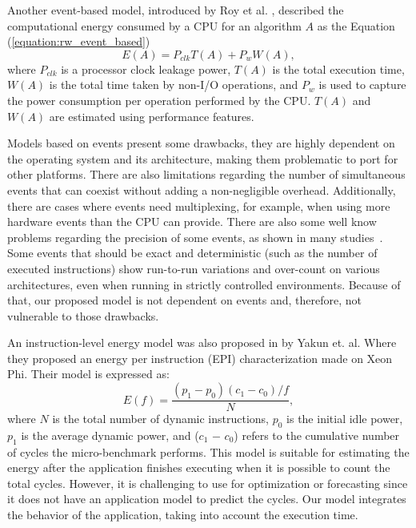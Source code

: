 Another event-based model, introduced by Roy et al. \cite{Roy2013AnAlgorithms}, described the computational energy consumed by a CPU for an algorithm $A$ as the Equation (\ref{equation:rw_event_based})%
\begin{equation}
E(A) = P_{clk}T(A) + P_wW(A),
\label{equation:rw_event_based}
\end{equation}
where $P_{clk}$ is a processor clock leakage power, $T(A)$ is the total execution time, $W(A)$ is the total time taken by  non-I/O operations, and $P_w$ is used to capture the power consumption per operation performed by the CPU. $T(A)$ and $W(A)$ are estimated using performance features.

Models based on events present some drawbacks, they are highly dependent on the operating system and its architecture, making them problematic to port for other platforms. There are also limitations regarding the number of simultaneous events that can coexist without adding a non-negligible overhead. Additionally, there are cases where events need multiplexing, for example, when using more hardware events than %
the CPU can provide. There are also some well know problems regarding the precision of some events, as shown in many studies~\cite{Weaver2008CanTrusted, Weaver2013Non-determinismImplementations, Das2019SoK:Security, McGuire2009AnalysisKernel, Ramos2019AnCounters, Silva-de-Souza2020ContainergyAWorkloads}. Some events that should be exact and deterministic (such as the number of executed instructions) show run-to-run variations and over-count on various architectures, even when running in strictly controlled environments. Because of that, our proposed model is not dependent on events and, therefore, not vulnerable to those drawbacks.

An instruction-level energy model was also proposed in \cite{Shao2013EnergyProcessor} by Yakun et. al. Where they proposed an energy per instruction (EPI) characterization made on Xeon Phi. Their model is expressed as:
\begin{equation}
E(f) = \frac{(p_1 - p_0)(c_1 - c_0)/f}{N}, 
\label{eq:rw_instruction_level}
\end{equation}
where $N$ is the total number of dynamic instructions, $p_0$ is the initial idle power, $p_1$ is the average dynamic power, and ($c_1$ $-$ $c_0$) refers to the cumulative number of cycles the micro-benchmark performs. This model is suitable for estimating the energy after the application finishes executing when it is possible to count the total cycles. However, it is challenging to use for optimization or forecasting since it does not have an application model to predict the cycles. Our model integrates the behavior of the application, taking into account the execution time.


